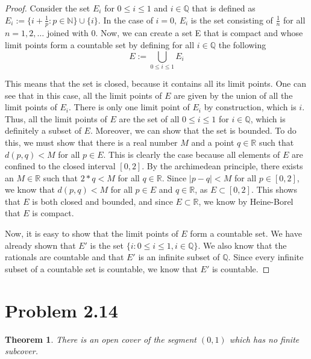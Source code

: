 \documentclass[psamsfonts]{amsart}
\newtheorem{thm}{Theorem}[section]
\theoremstyle{definition}
\theoremstyle{remark}
\numberwithin{equation}{section}
\begin{document}
\begin{proof}
Consider the set $E_i$ for $0 \leq i \leq 1$ and  $i \in \mathbb{Q}$ that is defined as $E_i := \{ i + \frac{1}{p}: p \in \mathbb{N} \} \cup \{i \}$. In the case of $i = 0$, $E_i$ is the set consisting of $\frac{1}{n}$ for all $n = 1,2,\ldots$ joined with $0$. Now, we can create a set E that is compact and whose limit points form a countable set by defining for all $i \in \mathbb{Q}$ the following
\begin{equation}
E := {\underset{0 \leq i \leq 1}{\bigcup}} E_i
\end{equation}

This means that the set is closed, because it contains all its limit points. One can see that in this case, all the limit points of $E$ are given by the union of all the limit points of $E_i$. There is only one limit point of $E_i$ by construction, which is $i$. Thus, all the limit points of $E$ are the set of all $0 \leq i \leq 1$ for $i \in \mathbb{Q}$, which is definitely a subset of $E$. Moreover, we can show that the set is bounded. To do this, we must show that there is a real number $M$ and a point $q \in \mathbb{R}$ such that $d(p,q) < M$ for all $p \in E$. This is clearly the case because all elements of $E$ are confined to the closed interval $[0,2]$. By the archimedean principle, there exists an $M \in \mathbb{R}$ such that $2*q < M$ for all $q \in \mathbb{R}$. Since $|p-q| < M$ for all $p \in [0,2]$, we know that $d(p,q) < M$ for all $p \in E$ and $ q \in \mathbb{R}$, as $E \subset [0,2]$. This shows that $E$ is both closed and bounded, and since $E \subset \mathbb{R}$, we know by Heine-Borel that $E$ is compact.

Now, it is easy to show that the limit points of $E$ form a countable set. We have already shown that $E'$ is the set $\{i: 0 \leq i \leq 1, i \in \mathbb{Q}\}$. We also know that the rationals are countable and that $E'$ is an infinite subset of $\mathbb{Q}$. Since every infinite subset of a countable set is countable, we know that $E'$ is countable.  
\end{proof}

\section{Problem 2.14}

\begin{thm}
There is an open cover of the segment $(0,1)$ which has no finite subcover.
\end{thm}
\end{document}
